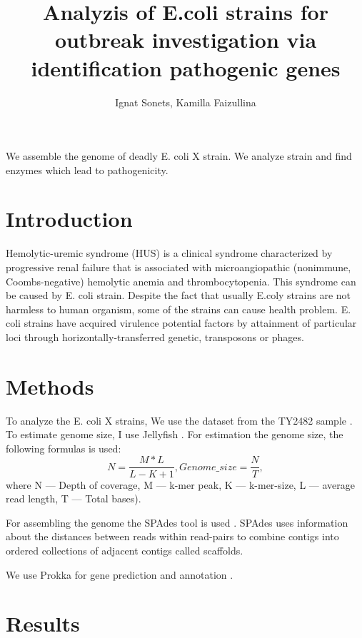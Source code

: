 \documentclass{article}
\title{ Analyzis of E.coli strains for outbreak investigation via identification pathogenic genes    }
\author{ Ignat Sonets, Kamilla Faizullina}
\date{\empty}
\begin{document}
\maketitle
We assemble the genome of deadly E. coli X strain. We analyze strain and find enzymes which lead to pathogenicity.
 
 
\section{Introduction}
Hemolytic-uremic syndrome (HUS) is a clinical syndrome characterized by progressive renal failure that is associated with microangiopathic (nonimmune, Coombs-negative) hemolytic anemia and thrombocytopenia. This syndrome can be caused by  E. coli strain. Despite the fact that usually E.coly strains are not harmless to human organism, some of the strains can cause health problem.  E. coli strains have acquired virulence potential factors by attainment of particular loci through horizontally-transferred genetic, transposons or phages.
 

\section{Methods}
To analyze the E. coli X strains, We use the dataset from the TY2482 sample \cite{data}. To estimate genome size, I use Jellyfish \cite{jellyfish}. For estimation the genome size, the following formulas is used: 
$$ N = \frac{M*L}{L-K+1}, Genome\_size = \frac{N}{T}, $$
where N --- Depth of coverage, M --- k-mer peak, K --- k-mer-size, L --- average read length, T --- Total bases).

For assembling the genome the SPAdes tool is used \cite {spades}. SPAdes uses information about the distances between reads within read-pairs to combine contigs into ordered collections of adjacent contigs called scaffolds. 

We use Prokka  for gene prediction and annotation \cite{prokka}.


\section{Results}
\end{document}
